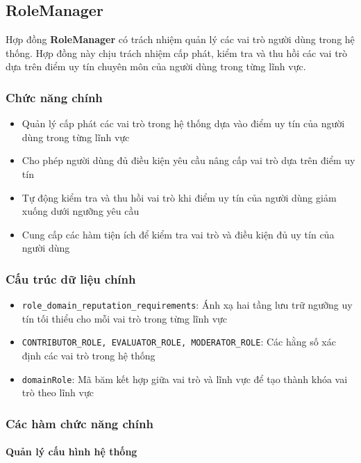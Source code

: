 \subsection{RoleManager}

Hợp đồng \textbf{RoleManager} có trách nhiệm quản lý các vai trò người dùng trong hệ thống. Hợp đồng này chịu trách nhiệm cấp phát, kiểm tra và thu hồi các vai trò dựa trên điểm uy tín chuyên môn của người dùng trong từng lĩnh vực.

\subsubsection{Chức năng chính}

\begin{itemize}
  \item Quản lý cấp phát các vai trò trong hệ thống dựa vào điểm uy tín của người dùng trong từng lĩnh vực
  \item Cho phép người dùng đủ điều kiện yêu cầu nâng cấp vai trò dựa trên điểm uy tín
  \item Tự động kiểm tra và thu hồi vai trò khi điểm uy tín của người dùng giảm xuống dưới ngưỡng yêu cầu
  \item Cung cấp các hàm tiện ích để kiểm tra vai trò và điều kiện đủ uy tín của người dùng
\end{itemize}

\subsubsection{Cấu trúc dữ liệu chính}

\begin{itemize}
  \item \texttt{role\_domain\_reputation\_requirements}: Ánh xạ hai tầng lưu trữ ngưỡng uy tín tối thiểu cho mỗi vai trò trong từng lĩnh vực
  \item \texttt{CONTRIBUTOR\_ROLE, EVALUATOR\_ROLE, MODERATOR\_ROLE}: Các hằng số xác định các vai trò trong hệ thống
  \item \texttt{domainRole}: Mã băm kết hợp giữa vai trò và lĩnh vực để tạo thành khóa vai trò theo lĩnh vực
\end{itemize}

\subsubsection{Các hàm chức năng chính}

\paragraph{Quản lý cấu hình hệ thống}

